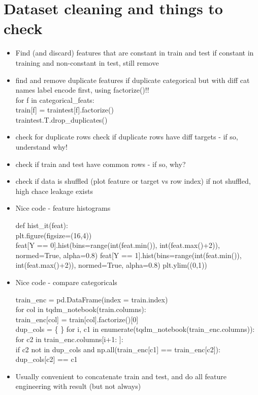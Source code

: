 \documentclass[a4paper]{report}
\newcommand{\brown}{\color{brown}}
\renewcommand{\t}{\hspace*{0.5cm}}
\newenvironment{tightcenter}{
  \setlength\topsep{0pt}
  \setlength\parskip{0pt}
  \begin{center}
  }{
  \end{center}
}
\newenvironment{codesnip}[1]
{\begin{tightcenter}\begin{minipage}{.85\textwidth}#1}
{\end{minipage}\end{tightcenter}}
\begin{document}
\section{Dataset cleaning and things to check}
\begin{itemize}
  \item Find (and discard) features that are constant in train and test
    \subitem if constant in training and non-constant in test, still remove
  \item find and remove duplicate features
    \subitem if duplicate categorical but with diff cat names label encode first, using factorize()!!\\
  for f in categorical\_feats:\\
  \hspace*{1cm} train[f] = traintest[f].factorize()\\
  traintest.T.drop\_duplicates()
  \item check for duplicate rows
    \subitem check if duplicate rows have diff targets - if so, understand why!
  \item check if train and test have common rows - if so, why?
  \item check if data is shuffled (plot feature or target vs row index)
    \subitem if not shuffled, high chace leakage exists
  \item Nice code - feature histograms
    \begin{codesnip}{\brown}
      def hist\_it(feat): \\
      \t plt.figure(figsize=(16,4))\\
      \t feat[Y == 0].hist(bins=range(int(feat.min()), int(feat.max()+2)), normed=True, alpha=0.8)
      \t feat[Y == 1].hist(bins=range(int(feat.min()), int(feat.max()+2)), normed=True, alpha=0.8)
      \t plt.ylim((0,1))

    \end{codesnip}
  \item Nice code - compare categoricals
    \begin{codesnip}{\brown}
      train\_enc = pd.DataFrame(index = train.index)\\
      for col in tqdm\_notebook(train.columns):\\
      \t train\_enc[col] = train[col].factorize()[0] \\

      dup\_cols = \{  \}
      for i, c1 in enumerate(tqdm\_notebook(train\_enc.columns)):\\
      \t for c2 in train\_enc.columns[i+1: ]:\\
      \t\t if c2 not in dup\_cols and np.all(train\_enc[c1] ==  train\_enc[c2]):
      \t\t\t dup\_cols[c2] == c1
    \end{codesnip}
  \item Usually convenient to concatenate train and test, and do all feature engineering with result (but not always)
\end{itemize}
\end{document}
